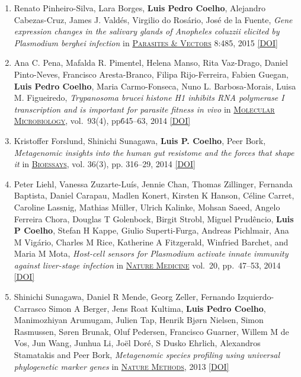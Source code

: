 \documentclass{article}
\newcommand\showdoi[1]{%
    \href{http://dx.doi.org/#1}{[DOI]}%
}
\newcommand\pubname[1]{\textsc{\uline{#1}}}
\newcommand\contribution[1]{\relax}
\begin{document}
\begin{enumerate}[resume]
\item Renato Pinheiro-Silva, Lara Borges, \textbf{Luis Pedro Coelho}, Alejandro
Cabezas-Cruz, James J. Valdés, Virgilio do Rosário, José de la Fuente,
\emph{Gene expression changes in the salivary glands of Anopheles coluzzii
elicited by Plasmodium berghei infection} in \pubname{Parasites \& Vectors}
8:485, 2015 \showdoi{10.1186/s13071-015-1079-8}
\contribution{I supervised the first-author, who was, at the time a PhD
student, in the statistical analysis of the RNA-seq data.}


\item Ana C. Pena, Mafalda R. Pimentel, Helena Manso, Rita Vaz-Drago, Daniel
Pinto-Neves, Francisco Aresta-Branco, Filipa Rijo-Ferreira, Fabien Guegan,
\textbf{Luis Pedro Coelho}, Maria Carmo-Fonseca, Nuno L. Barbosa-Morais, Luisa
M. Figueiredo, \emph{Trypanosoma brucei histone H1 inhibits RNA polymerase I
transcription and is important for parasite fitness in vivo} in
\pubname{Molecular Microbiology}, vol.\ 93(4), pp\. 645--63, 2014
\showdoi{10.1111/mmi.12677}
\contribution{I supervised D.P-N., who was at the time, a bioinformatics MSc
student, in the statistical analysis of the RNA-seq data.}

\item Kristoffer Forslund, Shinichi Sunagawa, \textbf{Luis P. Coelho}, Peer
Bork, \emph{Metagenomic insights into the human gut resistome and the forces that
shape it} in \pubname{Bioessays}, vol. 36(3), pp. 316--29, 2014
\showdoi{10.1002/bies.201300143}
\contribution{I performed data analysis.}

\item Peter Liehl, Vanessa Zuzarte-Luís, Jennie Chan, Thomas Zillinger,
Fernanda Baptista, Daniel Carapau, Madlen Konert, Kirsten K Hanson, Céline
Carret, Caroline Lassnig, Mathias Müller, Ulrich Kalinke, Mohsan Saeed,
Angelo Ferreira Chora, Douglas T Golenbock, Birgit Strobl, Miguel Prudêncio,
\textbf{Luis P Coelho}, Stefan H Kappe, Giulio Superti-Furga, Andreas
Pichlmair, Ana M Vigário, Charles M Rice, Katherine A Fitzgerald, Winfried
Barchet, and Maria M Mota, \emph{Host-cell sensors for Plasmodium activate
innate immunity against liver-stage infection} in \pubname{Nature Medicine}
vol.\ 20, pp.\ 47--53, 2014 \showdoi{10.1038/nm.3424}
\contribution{I performed statistical analysis of the gene expression data.}

\item Shinichi Sunagawa, Daniel R Mende, Georg Zeller, Fernando
Izquierdo-Carrasco Simon A Berger, Jens Roat Kultima, \textbf{Luis Pedro
Coelho}, Manimozhiyan Arumugam, Julien Tap, Henrik Bjørn Nielsen, Simon
Rasmussen, Søren Brunak, Oluf Pedersen, Francisco Guarner, Willem M de Vos,
Jun Wang, Junhua Li, Joël Doré, S Dusko Ehrlich, Alexandros Stamatakis and
Peer Bork, \emph{Metagenomic species profiling using universal phylogenetic
marker genes} in \pubname{Nature Methods}, 2013 \showdoi{10.1038/nmeth.2693}
\contribution{I implemented the stand-alone version of the published metagenomics tool.}



\end{enumerate}
\end{document}

